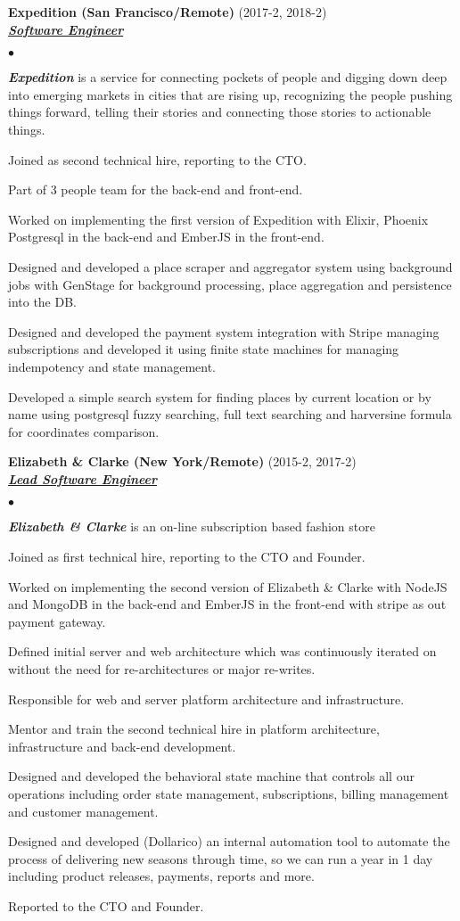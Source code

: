 \documentclass[a4paper]{article}
\newcommand{\employer}[3]{{
  \textbf{#1} (#2)\\ \underline{\textbf{\emph{#3}}}\\ }}
\newenvironment{achievements}{\begin{list}{$\bullet$}{\topsep 0pt \itemsep
  -2pt}}{\vspace*{4pt}\end{list}}
\newcommand{\emphasys}[1]{\textbf{\emph{#1}}}
\begin{document}
  \employer{ Expedition (San Francisco/Remote)}{2017-2, 2018-2}{Software Engineer}
  \begin{achievements}
  \item \emphasys{Expedition} is a service for connecting pockets of people and digging down deep into emerging markets in cities that are rising up, recognizing the people pushing things forward, telling their stories and connecting those stories to actionable things.
  \item Joined as second technical hire, reporting to the CTO.
  \item Part of 3 people team for the back-end and front-end.
  \item Worked on implementing the first version of Expedition with Elixir, Phoenix Postgresql in the back-end and EmberJS in the front-end.
  \item Designed and developed a place scraper and aggregator system using background jobs with GenStage for background processing, place aggregation and persistence into the DB.
  \item Designed and developed the payment system integration with Stripe managing subscriptions and developed it using finite state machines for managing indempotency and state management.
  \item Developed a simple search system for finding places by current location or by name using postgresql fuzzy searching, full text searching and harversine formula for coordinates comparison.
  \end{achievements}

  \employer{ Elizabeth \& Clarke (New York/Remote)}{2015-2, 2017-2}{Lead Software Engineer}
  \begin{achievements}
  \item \emphasys{Elizabeth \& Clarke} is an on-line subscription based fashion store
  \item Joined as first technical hire, reporting to the CTO and Founder.
  \item Worked on implementing the second version of Elizabeth \& Clarke with NodeJS and MongoDB in the back-end and EmberJS in the front-end with stripe as out payment gateway.
  \item Defined initial server and web architecture which was continuously iterated on without the need for re-architectures or major re-writes.
  \item Responsible for web and server platform architecture and infrastructure.
  \item Mentor and train the second technical hire in platform architecture, infrastructure and back-end development.
  \item Designed and developed the behavioral state machine that controls all our operations including order state management, subscriptions, billing management and customer management.
  \item Designed and developed (Dollarico) an internal automation tool to automate the process of delivering new seasons through time, so we can run a year in 1 day including product releases, payments, reports and more.
  \item Reported to the CTO and Founder.
  \end{achievements}
\end{document}
